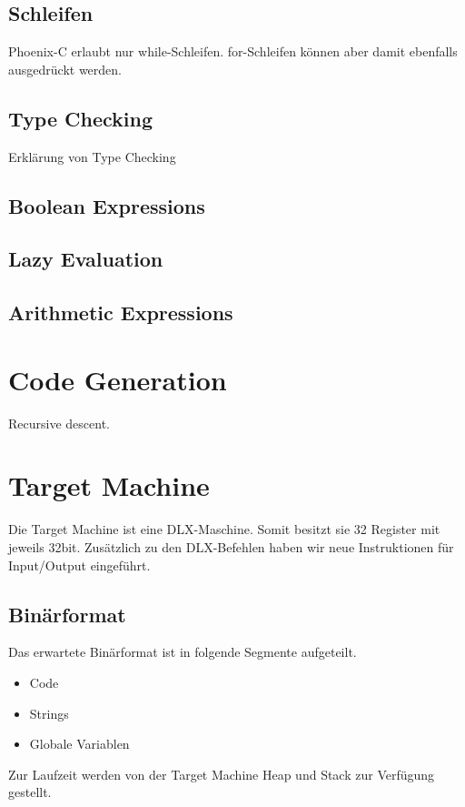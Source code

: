 \documentclass[a4paper]{article}
\begin{document}
	\subsection{Schleifen}

	Phoenix-C erlaubt nur while-Schleifen. for-Schleifen können aber damit ebenfalls ausgedrückt werden.

	\subsection{Type Checking}
	Erklärung von Type Checking

	\subsection{Boolean Expressions}

	\subsection{Lazy Evaluation}

	\subsection{Arithmetic Expressions}

	\section{Code Generation}
	Recursive descent.

	\section{Target Machine}
	Die Target Machine ist eine DLX-Maschine.
	Somit besitzt sie 32 Register mit jeweils 32bit.
	Zusätzlich zu den DLX-Befehlen haben wir neue Instruktionen für Input/Output eingeführt.

	\subsection{Binärformat}
	Das erwartete Binärformat ist in folgende Segmente aufgeteilt.
	\begin{itemize}
		\item Code
		\item Strings
		\item Globale Variablen
	\end{itemize}

	Zur Laufzeit werden von der Target Machine Heap und Stack zur Verfügung gestellt.
\end{document}

